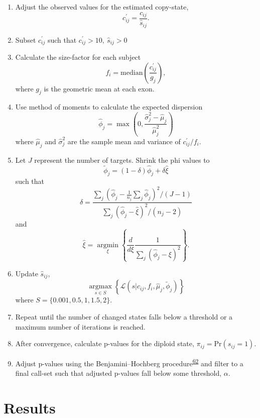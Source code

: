 \documentclass[11pt,letterpaper]{book}
\begin{document}
\begin{enumerate}
\def\labelenumi{\arabic{enumi}.}
\item
  Adjust the observed values for the estimated copy-state,
  \[
    c_{ij}^{\prime} = \frac{c_{ij}}{\hat{s}_{ij}}.
    \]
\item
  Subset \(c_{ij}^{\prime}\) such that \(c_{ij}^{\prime} > 10, ~ \hat{s}_{ij} > 0\)
\item
  Calculate the size-factor for each subject
  \[
    f_i = \text{median}\left(\frac{c_{ij}^{\prime}}{g_j}\right),
    \]
  where \(g_j\) is the geometric mean at each exon.
\item
  Use method of moments to calculate the expected dispersion
  \[
    \hat\phi_j = \max\left(0, \frac{\hat\sigma_j^2 - \hat{\mu}_j}{\hat{\mu}_j^2}\right)
    \]
  where \(\hat{\mu}_j\) and \(\hat{\sigma}_j^2\) are the sample mean and variance of \(c_{ij}^{\prime}/f_i\).
\item
  Let \(J\) represent the number of targets. Shrink the phi values to
  \[
    \tilde\phi_j = (1 - \delta)\hat\phi_j + \delta\hat{\xi}
    \]
  such that
  \[
    \delta = \frac{\sum\limits_j\left(\hat\phi_j - \frac{1}{n_j}\sum\limits_j \hat\phi_j\right)^2/(J - 1)}
    {\sum\limits_j\left(\hat\phi_j - \hat{\xi}\right)^2/(n_j - 2)}
    \]
  and
  \[
    \hat{\xi} = \mathop{\text{argmin}}\limits_{\xi}\left\{
    \frac{d}{d\xi}\frac{1}{\sum\limits_j \left(\hat\phi_j - \xi\right)^2}
    \right\}.
    \]
\item
  Update \(\hat{s}_{ij}\),
  \[
    \mathop{\text{argmax}}\limits_{s \in S}\left\{
    \mathcal{L}(s \rvert c_{ij},f_i,\hat\mu_j,\tilde\phi_j)
    \right\}
    \]
  where \(S = \{0.001, 0.5, 1, 1.5, 2\}\).
\item
  Repeat until the number of changed states falls below a threshold or a maximum number of iterations is reached.
\item
  After convergence, calculate p-values for the diploid state, \(\pi_{ij} = \text{Pr}(s_{ij} = 1)\).
\item
  Adjust p-values using the Benjamini--Hochberg procedure\textsuperscript{\protect\hyperlink{ref-benjamini:1995aa}{62}} and filter to a final call-set such that adjusted p-values fall below some threshold, \(\alpha\).
\end{enumerate}

\hypertarget{results}{%
\section{Results}\label{results}}
\end{document}
